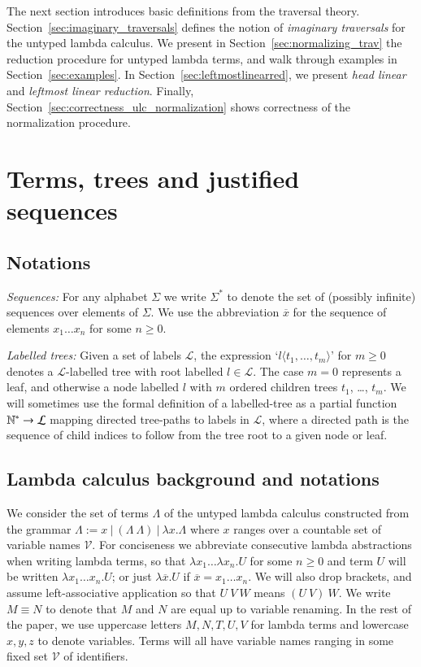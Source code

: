 \documentclass{elsarticle}
\theoremstyle{plain}
\theoremstyle{definition}
\theoremstyle{remark}
\newcommand\VarSet{\mathcal{V}}
\newcommand{\alphaequiv}{\equiv}
\begin{document}
The next section introduces basic definitions from the traversal theory. Section~\ref{sec:imaginary_traversals} defines the notion of \emph{imaginary traversals} for the untyped lambda calculus. We present in Section~\ref{sec:normalizing_trav} the reduction procedure for untyped lambda terms, and walk through examples in Section~\ref{sec:examples}. In Section~\ref{sec:leftmostlinearred}, we present \emph{head linear} and \emph{leftmost linear reduction}. Finally, Section~\ref{sec:correctness_ulc_normalization} shows correctness of the normalization procedure.


\section{Terms, trees and justified sequences}
\label{sec:basic_def}
\subsection{Notations}
\emph{Sequences:} For any alphabet $\Sigma$ we write $\Sigma^*$ to denote the set of (possibly infinite) sequences over elements of $\Sigma$.
 We use the abbreviation $\overline{x}$ for the sequence of elements $x_1 \ldots x_n$ for some $n\geq0$.

 \emph{Labelled trees:} Given a set of labels $\mathcal{L}$, the expression `$l\langle t_1, \ldots, t_m \rangle$' for $m \geq 0$ denotes a $\mathcal{L}$-labelled tree with root labelled $l\in \mathcal{L}$. The case $m=0$ represents a leaf, and otherwise a node labelled $l$ with $m$ ordered children trees $t_1$, \ldots, $t_m$. We will sometimes use the formal definition of a labelled-tree as a partial function $\mathbb{N}^* \rightarrow \mathcal{L}$ mapping directed tree-paths to labels in $\mathcal{L}$, where a directed path is the sequence of child indices to follow from the tree root to a given node or leaf.

\subsection{Lambda calculus background and notations}
\label{sec:lambdacalculus_basics}

We consider the set of terms $\Lambda$ of the untyped lambda calculus constructed from the grammar $\Lambda := x\ |\ (\Lambda\ \Lambda)\ |\ \lambda x. \Lambda $
where $x$ ranges over a countable set of variable names $\VarSet$.
For conciseness we abbreviate consecutive lambda abstractions when writing lambda terms, so that $\lambda x_1 \ldots \lambda x_n . U$ for some $n\geq 0$ and term $U$ will be written $\lambda x_1 \ldots x_n . U$; or just
$\lambda \overline{x} . U$ if $\overline{x} = x_1 \ldots x_n$.
We will also drop brackets, and assume left-associative application so that $U~V~W$ means $(U~V)~W$. We write $M \alphaequiv N$ to denote that $M$ and $N$ are equal up to variable renaming.
In the rest of the paper, we use uppercase letters $M, N, T, U, V$ for lambda terms and lowercase $x,y,z$ to denote variables. Terms will all have variable names ranging in some fixed set $\VarSet$ of identifiers.
\end{document}

